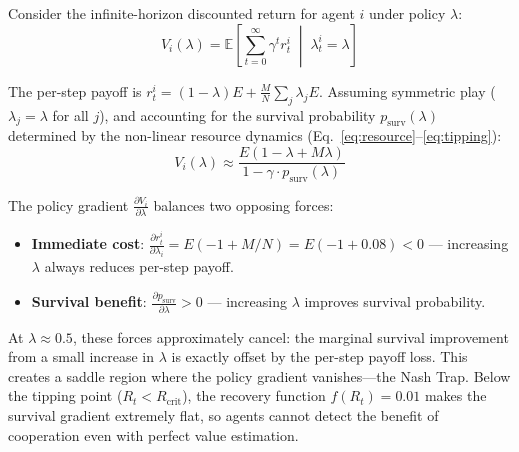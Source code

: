 \documentclass{article}
\begin{document}
Consider the infinite-horizon discounted return for agent $i$ under policy $\lambda$:
\begin{equation}
V_i(\lambda) = \mathbb{E}\left[\sum_{t=0}^{\infty} \gamma^t r_t^i \;\middle|\; \lambda_t^i = \lambda\right]
\end{equation}

The per-step payoff is $r_t^i = (1 - \lambda) E + \frac{M}{N} \sum_j \lambda_j E$.
Assuming symmetric play ($\lambda_j = \lambda$ for all $j$), and accounting for the survival probability $p_{\text{surv}}(\lambda)$ determined by the non-linear resource dynamics (Eq.~\ref{eq:resource}--\ref{eq:tipping}):
\begin{equation}
V_i(\lambda) \approx \frac{E(1 - \lambda + M\lambda)}{1 - \gamma \cdot p_{\text{surv}}(\lambda)}
\end{equation}

The policy gradient $\frac{\partial V_i}{\partial \lambda}$ balances two opposing forces:
\begin{itemize}
    \item \textbf{Immediate cost}: $\frac{\partial r_t^i}{\partial \lambda_i} = E(-1 + M/N) = E(-1 + 0.08) < 0$ --- increasing $\lambda$ always reduces per-step payoff.
    \item \textbf{Survival benefit}: $\frac{\partial p_{\text{surv}}}{\partial \lambda} > 0$ --- increasing $\lambda$ improves survival probability.
\end{itemize}

At $\lambda \approx 0.5$, these forces approximately cancel: the marginal survival improvement from a small increase in $\lambda$ is exactly offset by the per-step payoff loss. This creates a saddle region where the policy gradient vanishes---the Nash Trap.
Below the tipping point ($R_t < R_{\text{crit}}$), the recovery function $f(R_t) = 0.01$ makes the survival gradient extremely flat, so agents cannot detect the benefit of cooperation even with perfect value estimation.
\end{document}
